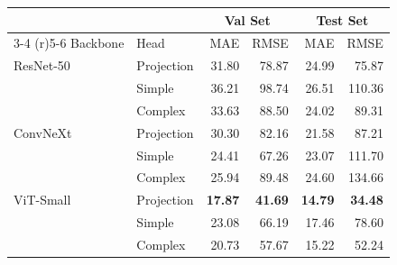\begin{tabular}{llrrrr}
\toprule
 & & \multicolumn{2}{c}{Val Set} & \multicolumn{2}{c}{Test Set} \\
 \cmidrule(r){3-4} \cmidrule(r){5-6}
 Backbone & Head & MAE & RMSE & MAE & RMSE \\
 \midrule

ResNet-50 & Projection & 31.80 & 78.87 & 24.99 & 75.87 \\
& Simple & 36.21 & 98.74 & 26.51 & 110.36\\
& Complex & 33.63 & 88.50 & 24.02 & 89.31
\\


ConvNeXt & Projection & 30.30 & 82.16 & 21.58 & 87.21 \\
 & Simple & 24.41 & 67.26 & 23.07 & 111.70 \\
 & Complex &  25.94 & 89.48 & 24.60 & 134.66 \\
ViT-Small & Projection & \textbf{17.87}  & \textbf{41.69} &  \textbf{14.79} & \textbf{34.48} \\

 & Simple & 23.08 & 66.19 & 17.46 & 78.60 \\
 &  Complex & 20.73 & 57.67 & 15.22 & 52.24 \\
\bottomrule
\end{tabular}
